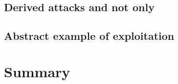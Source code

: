 \documentclass[final, xcolor = table, usenames,%
dvipsnames, table, aspectratio = 169]{beamer}
\begin{document}

% 

% 

% 

\subsection{Derived attacks and not only}


\subsection{Abstract example of exploitation}



\section{Summary}


\appendix


\end{document}
